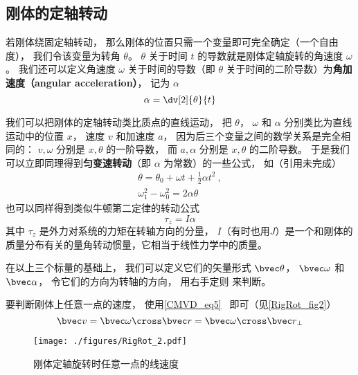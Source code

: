 

\subsection{刚体的定轴转动}
若刚体绕固定轴转动， 那么刚体的位置只需一个变量即可完全确定（一个自由度）， 我们令该变量为转角 $\theta$。 $\theta$ 关于时间 $t$ 的导数就是刚体定轴旋转的角速度 $\omega$。 我们还可以定义角速度 $\omega$ 关于时间的导数（即 $\theta$ 关于时间的二阶导数）为\textbf{角加速度（angular acceleration）}， 记为 $\alpha$
\begin{equation}
\alpha = \dv[2]{\theta}{t}
\end{equation}

我们可以把刚体的定轴转动类比质点的直线运动， 把 $\theta$， $\omega$ 和 $\alpha$ 分别类比为直线运动中的位置 $x$， 速度 $v$ 和加速度 $a$， 因为后三个变量之间的数学关系是完全相同的： $v, \omega$ 分别是 $x, \theta$ 的一阶导数， 而 $a, \alpha$ 分别是 $x, \theta$ 的二阶导数。 于是我们可以立即同理得到\textbf{匀变速转动}（即 $\alpha$ 为常数）的一些公式， 如（引用未完成）
\begin{gather}
\theta = \theta_0 + \omega t + \frac12 \alpha t^2~,\\
\omega_1^2 - \omega_0^2 = 2\alpha \theta
\end{gather}
也可以同样得到类似牛顿第二定律的转动公式
\begin{equation}
\tau_z = I \alpha
\end{equation}
其中 $\tau_z$ 是外力对系统的力矩在转轴方向的分量， $I$（有时也用$J$）是一个和刚体的质量分布有关的量角转动惯量，它相当于线性力学中的质量。

在以上三个标量的基础上， 我们可以定义它们的矢量形式 $\bvec \theta$， $\bvec \omega$ 和 $\bvec \alpha$， 令它们的方向为转轴的方向， 用右手定则 来判断。

要判断刚体上任意一点的速度， 使用\autoref{CMVD_eq5}~ 即可（见\autoref{RigRot_fig2}）
\begin{equation}
\bvec v = \bvec \omega \cross \bvec r = \bvec \omega \cross \bvec r_\bot
\end{equation}

\begin{figure}[ht]
\centering
\texttt{[image: ./figures/RigRot\_2.pdf]}
\caption{刚体定轴旋转时任意一点的线速度} \label{RigRot_fig2}
\end{figure}

